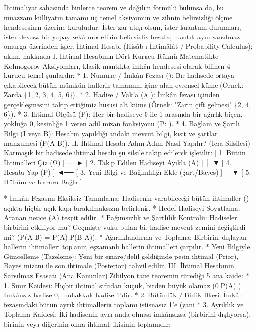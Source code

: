 \documentclass[11pt,a4paper]{article}
\begin{document}
İhtimaliyat sahasında binlerce teorem ve dağılım formülü bulunsa da, bu muazzam külliyatın tamamı üç temel aksiyomun ve zihnin belirsizliği ölçme hendesesinin üzerine kuruludur. İster zar atışı olsun, ister kuantum durumları, ister devasa bir yapay zekâ modelinin belirsizlik hesabı; mantık aynı sarsılmaz omurga üzerinden işler.
İhtimal Hesabı (Hisâb-ı İhtimâlât / Probability Calculus); aklın, hakkında %
I. İhtimal Hesabının Dört Kurucu Rüknü
Matematikte Kolmogorov Aksiyomları, klasik mantıkta imkân hendesesi olarak bilinen 4 kurucu temel şunlardır:
 * 1. Numune / İmkân Fezası (\Omega): Bir hadisede ortaya çıkabilecek bütün mümkün hallerin tamamını içine alan evrensel küme (Örnek: Zarda \{1, 2, 3, 4, 5, 6\}).
 * 2. Hadise / Vak'a (A \subseteq \Omega): İmkân fezası içinden gerçekleşmesini takip ettiğimiz hususi alt küme (Örnek: "Zarın çift gelmesi" \to \{2, 4, 6\}).
 * 3. İhtimal Ölçüsü (P): Her bir hadiseye 0 ile 1 arasında bir ağırlık biçen, yokluğa 0, kesinliğe 1 veren adil mizan fonksiyonu (P:  \to [0, 1]).
 * 4. Bağlam ve Şartlı Bilgi (I veya B): Hesabın yapıldığı andaki mevcut bilgi, kısıt ve şartlar manzumesi (P(A \mid B)).
II. İhtimal Hesabı Adım Adım Nasıl Yapılır? (İcra Silsilesi)
Karmaşık bir hadisede ihtimal hesabı şu silsile takip edilerek işletilir:
[ 1. Bütün İhtimalleri Çiz (Ω) ] ──► [ 2. Takip Edilen Hadiseyi Ayıkla (A) ]
                                                   │
                                                   ▼
[ 4. Hesabı Yap (P) ] ◄── [ 3. Yeni Bilgi ve Bağımlılığı Ekle (Şart/Bayes) ]
         │
         ▼
[ 5. Hüküm ve Karara Bağla ]

 * İmkân Fezasını Eksiksiz Tanımlama: Hadisenin varabileceği bütün ihtimaller (\Omega) açıkta hiçbir açık kapı bırakılmaksızın belirlenir.
 * Hedef Hadiseyi Soyutlama: Aranan netice (A) tespit edilir.
 * Bağımsızlık ve Şartlılık Kontrolü: Hadiseler birbirini etkiliyor mu? Geçmişte vuku bulan bir hadise mevcut zemini değiştirdi mi? (P(A \cap B) = P(A) \cdot P(B \mid A)).
 * Ağırlıklandırma ve Toplama: Birbirini dışlayan hallerin ihtimalleri toplanır, eşzamanlı hallerin ihtimalleri çarpılır.
 * Yeni Bilgiyle Güncelleme (Tazeleme): Yeni bir emare/delil geldiğinde peşin ihtimal (Prior), Bayes mizanı ile son ihtimale (Posterior) tahvil edilir.
III. İhtimal Hesabının Sarsılmaz Esasatı (Ana Kanunlar)
Zibilyon tane teoremin türediği 5 ana kaide:
 * 1. Sınır Kaidesi: Hiçbir ihtimal sıfırdan küçük, birden büyük olamaz (0 \le P(A) ). İmkânsız hadise 0, muhakkak hadise 1'dir.
 * 2. Bütünlük / Birlik İlkesi: İmkân fezasındaki bütün ayrık ihtimallerin toplamı istisnasız 1'e (yani %
 * 3. Ayrıklık ve Toplama Kaidesi: İki hadisenin aynı anda olması imkânsızsa (birbirini dışlıyorsa), birinin veya diğerinin olma ihtimali ikisinin toplamıdır:
   
\end{document}
